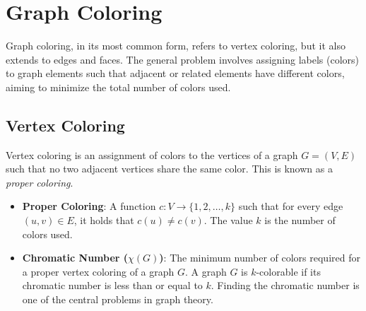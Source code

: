 \documentclass[11pt, a4paper]{article}
\begin{document}
\section{Graph Coloring}
Graph coloring, in its most common form, refers to vertex coloring, but it also extends to edges and faces. The general problem involves assigning labels (colors) to graph elements such that adjacent or related elements have different colors, aiming to minimize the total number of colors used.

\subsection{Vertex Coloring}
Vertex coloring is an assignment of colors to the vertices of a graph $G=(V, E)$ such that no two adjacent vertices share the same color. This is known as a \textit{proper coloring}.

\begin{itemize}[noitemsep,topsep=3pt,parsep=3pt,partopsep=0pt]
    \item \textbf{Proper Coloring}: A function $c: V \to \{1, 2, \ldots, k\}$ such that for every edge $(u,v) \in E$, it holds that $c(u) \neq c(v)$. The value $k$ is the number of colors used.
    \item \textbf{Chromatic Number ($\chi(G)$)}: The minimum number of colors required for a proper vertex coloring of a graph $G$. A graph $G$ is $k$-colorable if its chromatic number is less than or equal to $k$. Finding the chromatic number is one of the central problems in graph theory.
\end{itemize}
\end{document}
